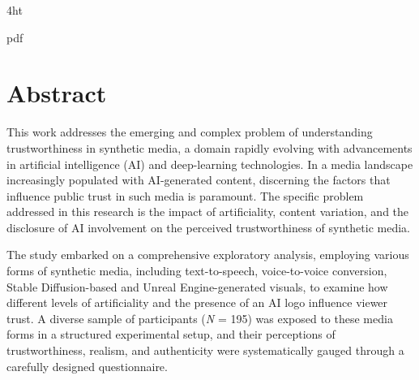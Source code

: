 \documentclass[
  a4paper,  %
  twoside,  %
  bibliography=totoc,
  headsepline,
  cleardoublepage=empty,
  parskip=half,
  draft=false
]{scrbook}
\begin{document}
\frontmatter
{} %
\setcounter{tocdepth}{2} %



\iftex4ht
  \Configure{$}{\PicMath}{\EndPicMath}{}

  {pdf}
  {%
  }
\fi



\Coverpage
\Copyright
\pagestyle{preamble}
\renewcommand*{\chapterpagestyle}{preamble}




\section*{Abstract}

This work addresses the emerging and complex problem of understanding trustworthiness in synthetic media, a domain rapidly evolving with advancements in artificial intelligence (AI) and deep-learning technologies. In a media landscape increasingly populated with AI-generated content, discerning the factors that influence public trust in such media is paramount. The specific problem addressed in this research is the impact of artificiality, content variation, and the disclosure of AI involvement on the perceived trustworthiness of synthetic media.

The study embarked on a comprehensive exploratory analysis, employing various forms of synthetic media, including text-to-speech, voice-to-voice conversion, Stable Diffusion-based and Unreal Engine-generated visuals, to examine how different levels of artificiality and the presence of an AI logo influence viewer trust. A diverse sample of participants (\textit{N} = 195) was exposed to these media forms in a structured experimental setup, and their perceptions of trustworthiness, realism, and authenticity were systematically gauged through a carefully designed questionnaire.
\end{document}
